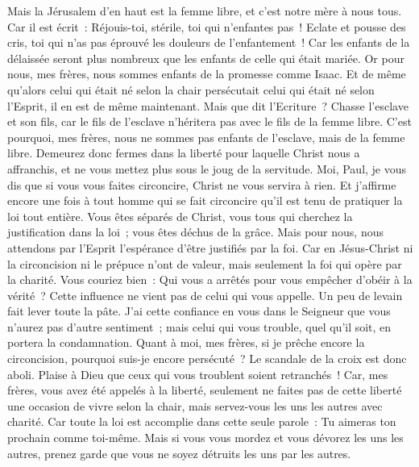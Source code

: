 \begin{multicols}{2}
Mais la Jérusalem d'en haut est la femme libre, et c'est notre mère à nous tous.
Car il est écrit~: Réjouis-toi, stérile, toi qui n'enfantes pas~! Eclate et pousse des cris, toi qui n'as pas éprouvé les douleurs de l'enfantement~! Car les enfants de la délaissée seront plus nombreux que les enfants de celle qui était mariée.
Or pour nous, mes frères, nous sommes enfants de la promesse comme Isaac.
Et de même qu'alors celui qui était né selon la chair persécutait celui qui était né selon l'Esprit, il en est de même maintenant.
Mais que dit l'Ecriture~? Chasse l'esclave et son fils, car le fils de l'esclave n'héritera pas avec le fils de la femme libre.
C'est pourquoi, mes frères, nous ne sommes pas enfants de l'esclave, mais de la femme libre.
\VerseOne{}Demeurez donc fermes dans la liberté pour laquelle Christ nous a affranchis, et ne vous mettez plus sous le joug de la servitude.
Moi, Paul, je vous dis que si vous vous faites circoncire, Christ ne vous servira à rien.
Et j'affirme encore une fois à tout homme qui se fait circoncire qu'il est tenu de pratiquer la loi tout entière.
Vous êtes séparés de Christ, vous tous qui cherchez la justification dans la loi~; vous êtes déchus de la grâce.
Mais pour nous, nous attendons par l'Esprit l'espérance d'être justifiés par la foi.
Car en Jésus-Christ ni la circoncision ni le prépuce n'ont de valeur, mais seulement la foi qui opère par la charité.
Vous couriez bien~: Qui vous a arrêtés pour vous empêcher d'obéir à la vérité~?
Cette influence ne vient pas de celui qui vous appelle.
Un peu de levain fait lever toute la pâte.
J'ai cette confiance en vous dans le Seigneur que vous n'aurez pas d'autre sentiment~; mais celui qui vous trouble, quel qu'il soit, en portera la condamnation.
Quant à moi, mes frères, si je prêche encore la circoncision, pourquoi suis-je encore persécuté~? Le scandale de la croix est donc aboli.
Plaise à Dieu que ceux qui vous troublent soient retranchés~!
Car, mes frères, vous avez été appelés à la liberté, seulement ne faites pas de cette liberté une occasion de vivre selon la chair, mais servez-vous les uns les autres avec charité.
Car toute la loi est accomplie dans cette seule parole~: Tu aimeras ton prochain comme toi-même.
Mais si vous vous mordez et vous dévorez les uns les autres, prenez garde que vous ne soyez détruits les uns par les autres.

\end{multicols}
